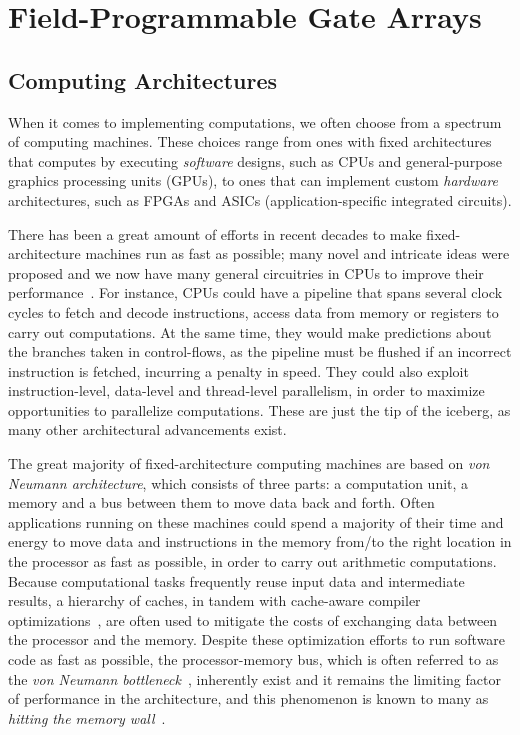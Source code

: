 \section{Field-Programmable Gate Arrays}
\label{bg:sec:fpga}

\subsection{Computing Architectures}
\label{bg:sub:computing_architectures}

When it comes to implementing computations, we often choose from a
spectrum of computing machines.  These choices range from ones with fixed
architectures that computes by executing \emph{software} designs, such as
CPUs and general-purpose graphics processing units (GPUs), to ones that can
implement custom \emph{hardware} architectures, such as FPGAs and ASICs
(application-specific integrated circuits).

There has been a great amount of efforts in recent decades to make
fixed-architecture machines run as fast as possible; many novel and intricate
ideas were proposed and we now have many general circuitries in CPUs to
improve their performance~\cite{comparch}.  For instance, CPUs could have a
pipeline that spans several clock cycles to fetch and decode instructions,
access data from memory or registers to carry out computations.  At the same
time, they would make predictions about the branches taken in control-flows,
as the pipeline must be flushed if an incorrect instruction is fetched,
incurring a penalty in speed.  They could also exploit instruction-level,
data-level and thread-level parallelism, in order to maximize opportunities to
parallelize computations.  These are just the tip of the iceberg, as many other
architectural advancements exist.

The great majority of fixed-architecture computing machines are based on
\emph{von Neumann architecture}, which consists of three parts: a computation
unit, a memory and a bus between them to move data back and forth.  Often
applications running on these machines could spend a majority of their time
and energy to move data and instructions in the memory from/to the right
location in the processor as fast as possible, in order to carry out arithmetic
computations.  Because computational tasks frequently reuse input data and
intermediate results, a hierarchy of caches, in tandem with cache-aware
compiler optimizations~\cite{kowarschik03}, are often used to mitigate the
costs of exchanging data between the processor and the memory.  Despite
these optimization efforts to run software code as fast as possible, the
processor-memory bus, which is often referred to as the \emph{von Neumann
bottleneck}~\cite{backus78}, inherently exist and it remains the limiting
factor of performance in the architecture, and this phenomenon is known to many
as \emph{hitting the memory wall}~\cite{bacon13, wulf94}.


